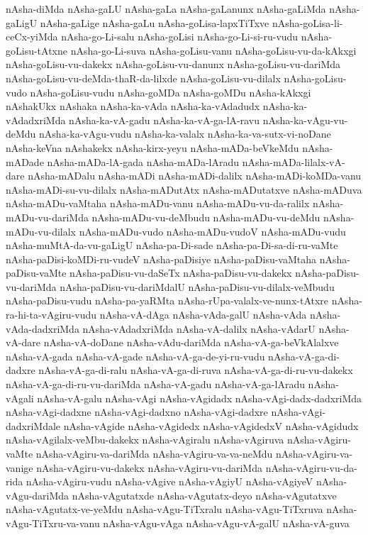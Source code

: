 {nAsha-diMda
nAsha-gaLU
nAsha-gaLa
nAsha-gaLanunx
nAsha-gaLiMda
nAsha-gaLigU
nAsha-gaLige
nAsha-gaLu
nAsha-goLisa-lapxTiTxve
nAsha-goLisa-li-ceCx-yiMda
nAsha-go-Li-salu
nAsha-goLisi
nAsha-go-Li-si-ru-vudu
nAsha-goLisu-tAtxne
nAsha-go-Li-suva
nAsha-goLisu-vanu
nAsha-goLisu-vu-da-kAkxgi
nAsha-goLisu-vu-dakekx
nAsha-goLisu-vu-danunx
nAsha-goLisu-vu-dariMda
nAsha-goLisu-vu-deMda-thaR-da-lilxde
nAsha-goLisu-vu-dilalx
nAsha-goLisu-vudo
nAsha-goLisu-vudu
nAsha-goMDa
nAsha-goMDu
nAsha-kAkxgi
nAshakUkx
nAshaka
nAsha-ka-vAda
nAsha-ka-vAdadudx
nAsha-ka-vAdadxriMda
nAsha-ka-vA-gadu
nAsha-ka-vA-ga-lA-ravu
nAsha-ka-vAgu-vu-deMdu
nAsha-ka-vAgu-vudu
nAsha-ka-valalx
nAsha-ka-va-sutx-vi-noDane
nAsha-keVna
nAshakekx
nAsha-kirx-yeyu
nAsha-mADa-beVkeMdu
nAsha-mADade
nAsha-mADa-lA-gada
nAsha-mADa-lAradu
nAsha-mADa-lilalx-vA-dare
nAsha-mADalu
nAsha-mADi
nAsha-mADi-dalilx
nAsha-mADi-koMDa-vanu
nAsha-mADi-su-vu-dilalx
nAsha-mADutAtx
nAsha-mADutatxve
nAsha-mADuva
nAsha-mADu-vaMtaha
nAsha-mADu-vanu
nAsha-mADu-vu-da-ralilx
nAsha-mADu-vu-dariMda
nAsha-mADu-vu-deMbudu
nAsha-mADu-vu-deMdu
nAsha-mADu-vu-dilalx
nAsha-mADu-vudo
nAsha-mADu-vudoV
nAsha-mADu-vudu
nAsha-muMtA-da-vu-gaLigU
nAsha-pa-Di-sade
nAsha-pa-Di-sa-di-ru-vaMte
nAsha-paDisi-koMDi-ru-vudeV
nAsha-paDisiye
nAsha-paDisu-vaMtaha
nAsha-paDisu-vaMte
nAsha-paDisu-vu-daSeTx
nAsha-paDisu-vu-dakekx
nAsha-paDisu-vu-dariMda
nAsha-paDisu-vu-dariMdalU
nAsha-paDisu-vu-dilalx-veMbudu
nAsha-paDisu-vudu
nAsha-pa-yaRMta
nAsha-rUpa-valalx-ve-nunx-tAtxre
nAsha-ra-hi-ta-vAgiru-vudu
nAsha-vA-dAga
nAsha-vAda-galU
nAsha-vAda
nAsha-vAda-dadxriMda
nAsha-vAdadxriMda
nAsha-vA-dalilx
nAsha-vAdarU
nAsha-vA-dare
nAsha-vA-doDane
nAsha-vAdu-dariMda
nAsha-vA-ga-beVkAlalxve
nAsha-vA-gada
nAsha-vA-gade
nAsha-vA-ga-de-yi-ru-vudu
nAsha-vA-ga-di-dadxre
nAsha-vA-ga-di-ralu
nAsha-vA-ga-di-ruva
nAsha-vA-ga-di-ru-vu-dakekx
nAsha-vA-ga-di-ru-vu-dariMda
nAsha-vA-gadu
nAsha-vA-ga-lAradu
nAsha-vAgali
nAsha-vA-galu
nAsha-vAgi
nAsha-vAgidadx
nAsha-vAgi-dadx-dadxriMda
nAsha-vAgi-dadxne
nAsha-vAgi-dadxno
nAsha-vAgi-dadxre
nAsha-vAgi-dadxriMdale
nAsha-vAgide
nAsha-vAgidedx
nAsha-vAgidedxV
nAsha-vAgidudx
nAsha-vAgilalx-veMbu-dakekx
nAsha-vAgiralu
nAsha-vAgiruva
nAsha-vAgiru-vaMte
nAsha-vAgiru-va-dariMda
nAsha-vAgiru-va-va-neMdu
nAsha-vAgiru-va-vanige
nAsha-vAgiru-vu-dakekx
nAsha-vAgiru-vu-dariMda
nAsha-vAgiru-vu-da-rida
nAsha-vAgiru-vudu
nAsha-vAgive
nAsha-vAgiyU
nAsha-vAgiyeV
nAsha-vAgu-dariMda
nAsha-vAgutatxde
nAsha-vAgutatx-deyo
nAsha-vAgutatxve
nAsha-vAgutatx-ve-yeMdu
nAsha-vAgu-TiTxralu
nAsha-vAgu-TiTxruva
nAsha-vAgu-TiTxru-va-vanu
nAsha-vAgu-vAga
nAsha-vAgu-vA-galU
nAsha-vA-guva
}
